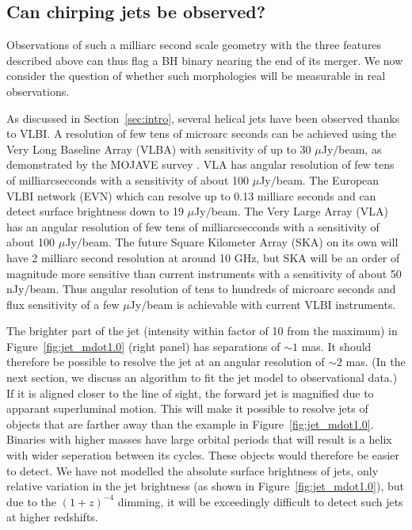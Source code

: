 \documentclass[a4paper,fleqn,usenatbib]{mnras}
\begin{document}
\subsection{Can chirping jets be observed?}

Observations of such a milliarc second scale geometry with the three
features described above can thus flag a BH binary nearing the end of
its merger.  We now consider the question of whether such morphologies
will be measurable in real observations. 

As discussed in Section~\ref{sec:intro}, several helical jets have
been observed thanks to VLBI.  A resolution of few tens of microarc
seconds can be achieved using the Very Long Baseline Array (VLBA) with
sensitivity of up to 30 $\mu$Jy$/$beam, as demonstrated by the MOJAVE
survey \citep{2009AJ....138.1874L}.  VLA has angular resolution of few
tens of milliarcsecconds with a sensitivity of about 100
$\mu$Jy$/$beam.  The European VLBI network (EVN) which can resolve up
to 0.13 milliarc seconds and can detect surface brightness down to 19
$\mu$Jy$/$beam.  The Very Large Array (VLA) has an angular resolution
of few tens of milliarcsecconds with a sensitivity of about 100
$\mu$Jy$/$beam.  The future Square Kilometer Array (SKA) on its own
will have 2 milliarc second resolution at around 10 GHz, but SKA will
be an order of magnitude more sensitive than current instruments with
a sensitivity of about 50 nJy$/$beam.  Thus angular resolution of tens
to hundreds of microarc seconds and flux sensitivity of a few
$\mu$Jy$/$beam is achievable with current VLBI instruments.

The brighter part of the jet (intensity within factor of 10 from the
maximum) in Figure~\ref{fig:jet_mdot1.0} (right panel) has separations
of $\sim 1$ mas.  It should therefore be possible to resolve the jet
at an angular resolution of $\sim 2$ mas.  (In the next section, we
discuss an algorithm to fit the jet model to observational data.)  If
it is aligned closer to the line of sight, the forward jet is
magnified due to apparant superluminal motion.  This will make it
possible to resolve jets of objects that are farther away than the
example in Figure~\ref{fig:jet_mdot1.0}.  Binaries with higher masses
have large orbital periods that will result is a helix with wider
seperation between its cycles.  These objects would therefore be
easier to detect.  We have not modelled the absolute surface
brightness of jets, only relative variation in the jet brightness (as
shown in Figure~\ref{fig:jet_mdot1.0}), but due to the $(1+z)^{-4}$
dimming, it will be exceedingly difficult to detect such jets at
higher redshifts.
\end{document}
